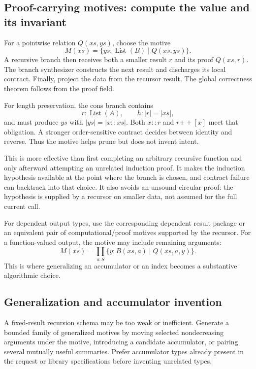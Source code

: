 \subsection{Proof-carrying motives: compute the value and its invariant}

For a pointwise relation $Q(xs,ys)$, choose the motive
\begin{equation}\label{eq:packed-motive}
 M(xs)=\{ys:\operatorname{List}(B)\mid Q(xs,ys)\}.
\end{equation}
A recursive branch then receives both a smaller result $r$ and its proof
$Q(xs,r)$. The branch synthesizer constructs the next result and discharges its
local contract. Finally, project the data from the recursor result. The global
correctness theorem follows from the proof field.

For length preservation, the cons branch contains
\[
 r:\operatorname{List}(A),\qquad h:|r|=|xs|,
\]
and must produce $ys$ with $|ys|=|x::xs|$. Both $x::r$ and $r\mathbin{++}[x]$
meet that obligation. A stronger order-sensitive contract decides between
identity and reverse. Thus the motive helps prune but does not invent intent.

This is more effective than first completing an arbitrary recursive function
and only afterward attempting an unrelated induction proof. It makes the
induction hypothesis available at the point where the branch is chosen, and
contract failure can backtrack into that choice. It also avoids an unsound
circular proof: the hypothesis is supplied by a recursor on smaller data, not
assumed for the full current call.

For dependent output types, use the corresponding dependent result package or
an equivalent pair of computational/proof motives supported by the recursor.
For a function-valued output, the motive may include remaining arguments:
\[
 M(xs)=\prod_{a:S}\{y:B(xs,a)\mid Q(xs,a,y)\}.
\]
This is where generalizing an accumulator or an index becomes a substantive
algorithmic choice.

\subsection{Generalization and accumulator invention}

A fixed-result recursion schema may be too weak or inefficient. Generate a
bounded family of generalized motives by moving selected nondecreasing
arguments under the motive, introducing a candidate accumulator, or pairing
several mutually useful summaries. Prefer accumulator types already present
in the request or library specifications before inventing unrelated types.

